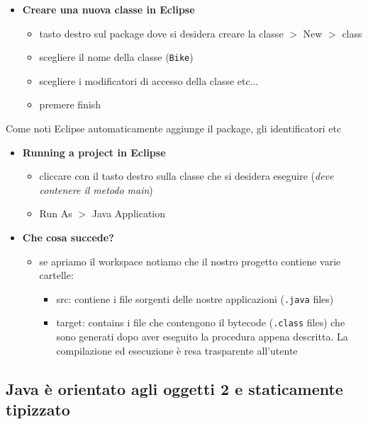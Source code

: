 \documentclass{article}
\theoremstyle{definition}
\begin{document}
\begin{itemize}
\item \textbf{Creare una nuova classe in Eclipse}
\begin{itemize}
\item tasto destro sul package dove si desidera creare la classe  $>$ New $>$ class 
\item scegliere il nome della classe (\texttt{Bike})
\item scegliere i modificatori di accesso della classe etc...
\item premere finish
\end{itemize}
\end{itemize}
Come noti  Eclipse automaticamente aggiunge il package, gli identificatori etc

\begin{itemize}
\item \textbf{Running a project in Eclipse}
\begin{itemize}
\item cliccare con il tasto destro sulla classe che si desidera eseguire (\emph{deve contenere il metodo  main})
\item Run As $>$ Java Application
\end{itemize}
\end{itemize}

\begin{itemize}
\item \textbf{Che cosa succede?}
\begin{itemize}
\item se apriamo il workspace notiamo che il nostro progetto contiene varie cartelle: 
\begin{itemize}
\item src: contiene i file sorgenti delle nostre applicazioni (\texttt{.java} files)
\item target: contains i file che contengono il bytecode (\texttt{.class} files) che sono generati dopo aver eseguito la procedura appena descritta. La compilazione ed esecuzione \`e resa trasparente all'utente
\end{itemize}
\end{itemize}
\end{itemize}

\subsection{Java \`e orientato agli oggetti 2 e staticamente tipizzato}
\end{document}
